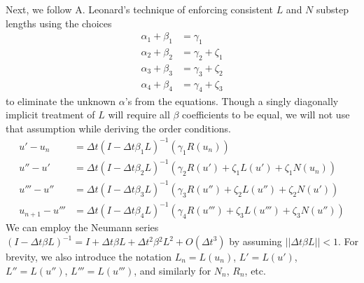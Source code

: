 \documentclass[letterpaper,11pt]{amsart}
\newcommand{\order}[2]{\ensuremath{O\!\left( {#1}^{#2} \right)}}
\begin{document}
Next, we follow A. Leonard's technique of enforcing consistent $L$ and $N$
substep lengths using the choices
\begin{subequations}
\begin{align}
  \alpha_{1} + \beta_{1} &= \gamma_{1}
  \\
  \alpha_{2} + \beta_{2} &= \gamma_{2}+\zeta_{1}
  \\
  \alpha_{3} + \beta_{3} &= \gamma_{3}+\zeta_{2}
  \\
  \alpha_{4} + \beta_{4} &= \gamma_{4}+\zeta_{3}
\end{align}
\end{subequations}
to eliminate the unknown $\alpha$'s from the equations.  Though a singly
diagonally implicit treatment of $L$ will require all $\beta$ coefficients to
be equal, we will not use that assumption while deriving the order conditions.
\begin{subequations}
\begin{align}
  u' - u_{n}
  &=
  \Delta{}t \left( I - \Delta{}t \beta_{1} L \right)^{-1} \left(
    \gamma_{1} R(u_{n})
  \right)
\\
  u'' - u'
  &=
  \Delta{}t \left( I - \Delta{}t \beta_{2} L \right)^{-1} \left(
      \gamma_{2} R(u')
    + \zeta_{1} L(u')
    + \zeta_{1} N(u_{n})
  \right)
\\
  u''' - u''
  &=
  \Delta{}t \left( I - \Delta{}t \beta_{3} L \right)^{-1} \left(
      \gamma_{3} R(u'')
    + \zeta_{2}  L(u'')
    + \zeta_{2}  N(u')
  \right)
\\
  u_{n+1} - u'''
  &=
  \Delta{}t \left( I - \Delta{}t \beta_{4} L \right)^{-1} \left(
      \gamma_{4} R(u''')
    + \zeta_{3}  L(u''')
    + \zeta_{3}  N(u'')
  \right)
\end{align}
\end{subequations}
We can employ the Neumann series $\left( I - \Delta{}t  \beta{}
L \right)^{-1} = I + \Delta{}t \beta{} L + \Delta{}t^{2} \beta{}^{2}
L^{2} + \order{\Delta{}t}{3}$ by assuming $||\Delta{}t\beta{}L||<1$.
For brevity, we also introduce the notation
$L_{n}=L(u_{n})$,
$L'=L(u')$,
$L''=L(u'')$,
$L'''=L(u''')$,
and similarly for $N_{n}$, $R_{n}$, etc.
\end{document}
